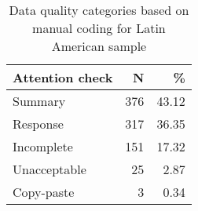 \begin{table}

\caption{Data quality categories based on manual coding for Latin American sample}
\centering
\begin{tabular}[t]{lrr}
\toprule
Attention check & N & \%\\
\midrule
Summary & 376 & \num{43.12}\\
Response & 317 & \num{36.35}\\
Incomplete & 151 & \num{17.32}\\
Unacceptable & 25 & \num{2.87}\\
Copy-paste & 3 & \num{0.34}\\
\bottomrule
\end{tabular}
\end{table}
